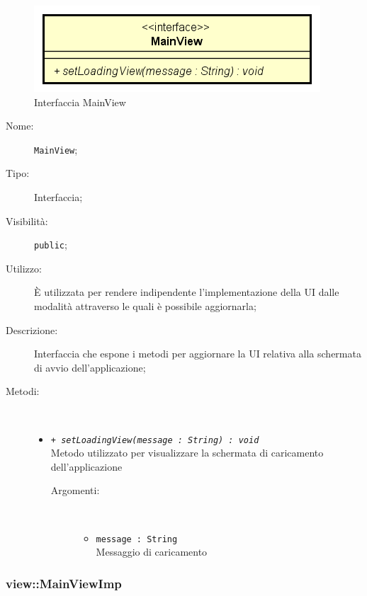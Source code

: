 \documentclass[../DefinizioneDiProdotto.tex]{subfiles}
\begin{document}
    \begin{figure}[H]
        \centering
        \includegraphics{img/MainView.png}
        \caption{Interfaccia MainView}\label{fig:view::MainView} 
    \end{figure}
    \begin{description}
\item[Nome:] \texttt{MainView};
\item[Tipo:] Interfaccia;
\item[Visibilità:] \texttt{public};
\item[Utilizzo:] È utilizzata per rendere indipendente l'implementazione della UI dalle modalità attraverso le quali è possibile aggiornarla;
\item[Descrizione:] Interfaccia che espone i metodi per aggiornare la UI relativa alla schermata di avvio dell'applicazione;
\item[Metodi:] \
\begin{itemize}
\item \texttt{+ \textit{setLoadingView(message : String) : void}}\\
Metodo utilizzato per visualizzare la schermata di caricamento dell'applicazione
 \begin{description}
\item[Argomenti:] \
\begin{itemize}
\item \texttt{message : String}\\
Messaggio di caricamento\end{itemize}
\end{description}
\end{itemize}
\end{description}

\subsubsection{view::MainViewImp}
\end{document}
